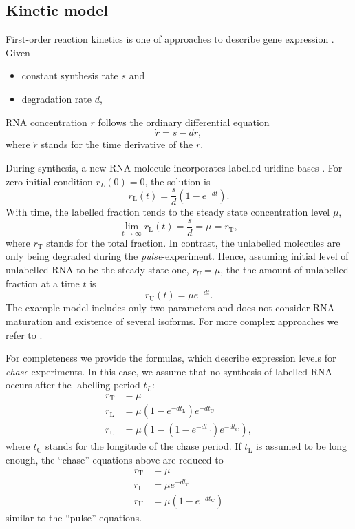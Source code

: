 \subsection{Kinetic model}
\label{subsec:kinetics}
First-order reaction kinetics  is one of approaches to describe gene expression 
\citep{kaern2005stochasticity}.
Given
\begin{itemize}
 \item constant synthesis rate $s$ and
\item degradation rate $d$, 
\end{itemize}
RNA concentration $r$ follows the ordinary differential equation
\begin{equation}
 \dot{r} = s - dr,
\end{equation}
where $\dot{r}$ stands for the time derivative of the $r$.
\par
During synthesis, a new RNA molecule incorporates labelled uridine bases 
\cite{A}.
For zero initial condition $r_L(0) = 0$, the solution is
\begin{equation}
 r_\text{L}(t) = \frac{s}{d}\left(1 - e^{-dt}\right). \label{eq:labelled}
\end{equation}
With time, the labelled fraction tends to the steady state concentration
level $\mu$, 
\begin{equation}
\lim_{t\to\infty} r_\text{L}(t) = \frac{s}{d} = \mu = r_\text{T},
\end{equation}
where $r_\text{T}$ stands for the total fraction.
In contrast, the unlabelled molecules are only being degraded during the 
\emph{pulse}-experiment.
Hence, assuming initial level of unlabelled RNA to be the steady-state one, 
$r_U = \mu$,
the the amount of unlabelled fraction at a time $t$ is
\begin{equation}
 r_\text{U}(t) = \mu e^{-dt}.
\end{equation}
The example model includes only two parameters and does not consider
RNA maturation and existence of several isoforms.
For more complex approaches we refer to \cite{A}.
\par
For completeness we provide the formulas,
which describe expression levels for \emph{chase}-experiments.
In this case, we assume that no synthesis of labelled RNA occurs after 
the labelling period $t_L$:
\begin{align}
 r_\text{T}&=\mu\\
 r_\text{L}&=\mu \left(1-e^{-dt_\text{L}}\right)e^{-dt_\text{C}}\\
 r_\text{U}&=\mu \left(1-\left(1-e^{-dt_\text{L}}\right)e^{-dt_\text{C}}\right),
\end{align}
where $t_\text{C}$ stands for the longitude of the chase period.
If $t_\text{L}$ is assumed to be long enough, the ``chase''-equations above are reduced to 
\begin{align}
 r_\text{T}&=\mu\\
 r_\text{L}&=\mu e^{-dt_\text{C}}\\
 r_\text{U}&=\mu \left(1-e^{-dt_\text{C}}\right)
\end{align}
similar to the ``pulse''-equations.
\par

